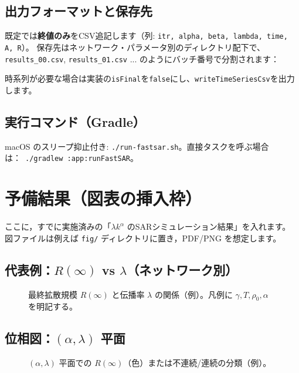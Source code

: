 \documentclass[uplatex,dvipdfmx,11pt]{bxjsarticle}
\begin{document}
\subsection{出力フォーマットと保存先}
既定では\textbf{終値のみ}をCSV追記します（列: \texttt{itr, alpha, beta, lambda, time, A, R}）。
保存先はネットワーク・パラメータ別のディレクトリ配下で、\texttt{results\_00.csv}, \texttt{results\_01.csv} ... のようにバッチ番号で分割されます：
\begin{quote}\small
\end{quote}
時系列が必要な場合は実装の\texttt{isFinal}を\texttt{false}にし、\texttt{writeTimeSeriesCsv}を出力します。

\subsection{実行コマンド（Gradle）}
macOS のスリープ抑止付き: \texttt{./run-fastsar.sh}。直接タスクを呼ぶ場合は：\ \texttt{./gradlew :app:runFastSAR}。

\section{予備結果（図表の挿入枠）}
ここに，すでに実施済みの「$\lambda k^\alpha$ のSARシミュレーション結果」を入れます。
図ファイルは例えば \texttt{fig/} ディレクトリに置き，PDF/PNG を想定します。

\subsection{代表例：\texorpdfstring{$R(\infty)$}{R(infty)} vs \texorpdfstring{$\lambda$}{lambda}（ネットワーク別）}
\begin{figure}[htbp]
  \centering
  \caption{最終拡散規模 $R(\infty)$ と伝播率 $\lambda$ の関係（例）。凡例に $\gamma, T, \rho_0, \alpha$ を明記する。}
  \label{fig:Rinf_lambda}
\end{figure}

\subsection{位相図：\texorpdfstring{$(\alpha,\lambda)$}{(alpha, lambda)} 平面}
\begin{figure}[htbp]
  \centering
  \caption{$(\alpha,\lambda)$ 平面での $R(\infty)$（色）または不連続/連続の分類（例）。}
  \label{fig:phase_alpha_lambda}
\end{figure}
\end{document}
